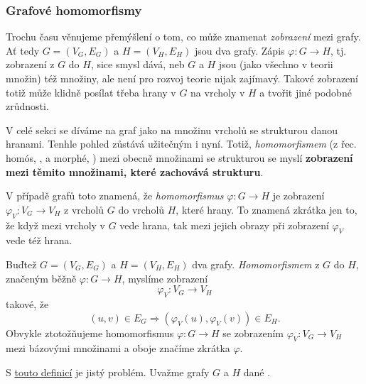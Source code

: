 \subsubsection{Grafové homomorfismy}
\label{sssec:grafove-homomorfismy}

Trochu času věnujeme přemýšlení o tom, co může znamenat \emph{zobrazení} mezi
grafy. Ať tedy $G = (V_G,E_G)$ a $H = (V_H,E_H)$ jsou dva grafy. Zápis
$\varphi:G \to H$, tj. zobrazení z $G$ do $H$, sice smysl dává, neb $G$ a $H$
jsou (jako všechno v teorii množin) též množiny, ale není pro rozvoj teorie
nijak zajímavý. Takové zobrazení totiž může klidně posílat třeba hrany v $G$ na
vrcholy v $H$ a tvořit jiné podobné zrůdnosti.

V celé sekci se díváme na graf jako na množinu vrcholů se strukturou danou
hranami. Tenhle pohled zůstává užitečným i nyní. Totiž, \emph{homomorfismem} (z
řec. homós, , a morphé, ) mezi obecně množinami se
strukturou se myslí \textbf{zobrazení mezi těmito množinami, které zachovává
strukturu}.

V případě grafů toto znamená, že \emph{homomorfismus} $\varphi:G \to H$ je
zobrazení $\varphi_V:V_G \to V_H$ z vrcholů $G$ do vrcholů $H$, které
 hrany. To znamená zkrátka jen to, že když mezi vrcholy v $G$ vede
hrana, tak mezi jejich obrazy při zobrazení $\varphi_V$ vede též hrana.

\begin{definition}
 \label{def:grafovy-homomorfismus}
 Buďtež $G = (V_G,E_G)$ a $H = (V_H,E_H)$ dva grafy. \emph{Homomorfismem} z $G$
 do $H$, značeným běžně $\varphi:G \to H$, myslíme zobrazení
 \[
  \varphi_V:V_G \to V_H
 \]
 takové, že
 \[
  (u,v) \in E_G \Rightarrow (\varphi_V(u),\varphi_V(v)) \in E_H.
 \]
 Obvykle ztotožňujeme homomorfismus $\varphi:G \to H$ se zobrazením
 $\varphi_V:V_G \to V_H$ mezi bázovými množinami a oboje značíme zkrátka
 $\varphi$.
\end{definition}

S \hyperref[def:grafovy-homomorfismus]{touto definicí} je jistý problém. Uvažme
grafy $G$ a $H$ dané .

